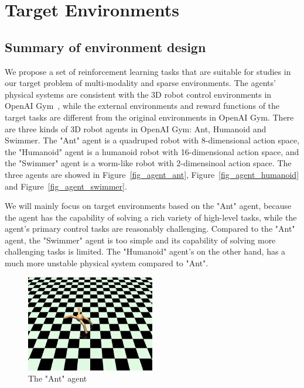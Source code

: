 \section{Target Environments}\label{sec_env}
\subsection{Summary of environment design}
We propose a set of reinforcement learning tasks that are suitable for studies in our target problem of multi-modality and sparse environments. The agents' physical systems are consistent with the 3D robot control environments in OpenAI Gym~\cite{openaigym}, while the external environments and reward functions of the target tasks are different from the original environments in OpenAI Gym. There are three kinds of 3D robot agents in OpenAI Gym: Ant, Humanoid and Swimmer. The "Ant" agent is a quadruped robot with 8-dimensional action space, the "Humanoid" agent is a humanoid robot with 16-dimensional action space, and the "Swimmer" agent is a worm-like robot with 2-dimensinoal action space.  The three agents are showed in Figure~\ref{fig_agent_ant}, Figure~\ref{fig_agent_humanoid} and Figure~\ref{fig_agent_swimmer}.

We will mainly focus on target environments based on the "Ant" agent, because the agent has the capability of solving a rich variety of high-level tasks, while the agent's primary control tasks are reasonably challenging. 
Compared to the "Ant" agent, the "Swimmer" agent is too simple and its capability of solving more challenging tasks is limited. The "Humanoid" agent's  on the other hand, has a much more unstable physical system compared to "Ant". 
\begin{figure}[H]
	\includegraphics[width=0.5\textwidth]{images/agent_ant.png}
	\centering
	\caption{The "Ant" agent}
\end{figure}\label{fig_agent_ant}

